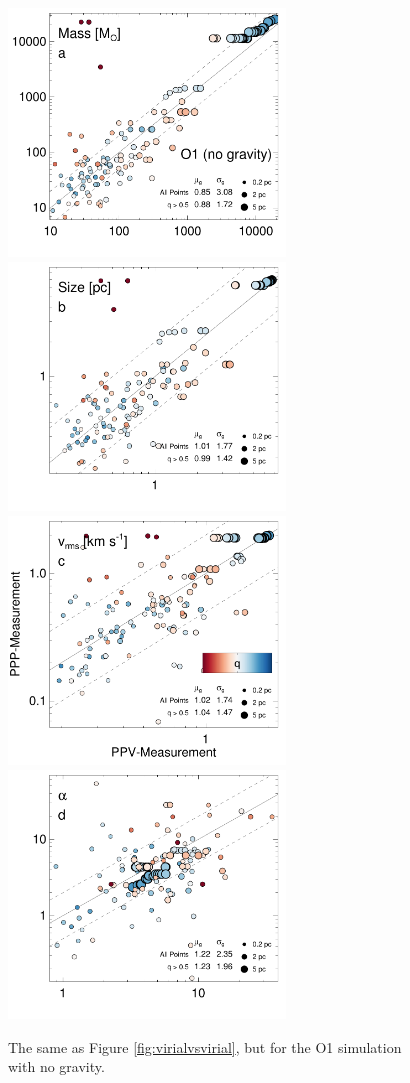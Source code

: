\begin{figure}[htbp]
\includegraphics[width=2.9in]{figures/mass_nog_13co}\hfill
\includegraphics[width=2.9in]{figures/size_nog_13co}
\includegraphics[width=2.9in]{figures/vel_nog_13co}\hfill
\includegraphics[width=2.9in]{figures/virial_nog_13co}
\caption{The same as Figure \ref{fig:virialvsvirial}, but for the O1 simulation with no gravity.}
\label{fig:virialvsvirial_nog}
\end{figure}

